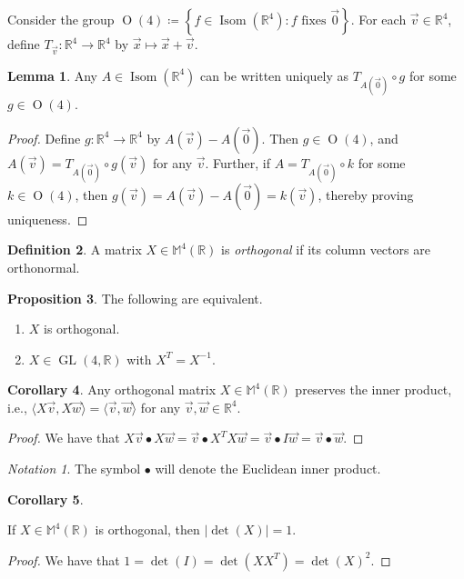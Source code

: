 \documentclass[10pt,letterpaper,cm]{nupset}
\theoremstyle{definition}
\newtheorem{definition}{Definition}[section]
\theoremstyle{theorem}
\newtheorem{lemma}[definition]{Lemma}
\newtheorem{cor}[definition]{Corollary}
\newtheorem{prop}[definition]{Proposition}
\theoremstyle{remark}
\newtheorem*{notation}{Notation}
\newcommand{\M}{\mathbb M}
\newcommand{\R}{\mathbb R}
\newcommand{\1}{\mathbf{1}}
\renewcommand{\v}{\vec v}
\newcommand{\w}{\vec w}
\newcommand{\x}{\vec x}
\newcommand{\0}{\vec {0}}
\DeclareMathOperator{\ORT}{O}
\DeclareMathOperator{\Isom}{Isom}
\DeclareMathOperator{\GL}{GL}
\begin{document}
Consider the group $\ORT(4)\coloneqq \left\{f\in  \Isom(\R^4): f \text{ fixes } \0\right\}$. For each $\v\in \R^4$, define $T_{\v}:\R^4\to \R^4$ by $\x \mapsto \x + \v$.

\begin{lemma}\label{l1}
Any $A\in \Isom(\R^4)$ can be  written uniquely as $T_{A(\0)}\circ g$ for some $g\in \ORT(4)$. 
\end{lemma}
\begin{proof}
Define $g:\R^4\to \R^4$ by $A(\v)-A(\0)$. Then $g\in \ORT(4)$, and $A(\v)=T_{A(\0)}\circ g(\v)$ for any $\v$. Further, if $A=T_{A(\0)}\circ k$ for some $k\in \ORT(4)$, then $g(\v)=A(\v)-A(\0)=k(\v)$, thereby proving uniqueness. 
\end{proof}

\begin{definition} 
A matrix  $X\in \M^4(\R)$ is \textit{orthogonal} if its column vectors are orthonormal.
\end{definition}

\begin{prop} The following are equivalent.
\begin{enumerate}[label=(\alph*)]  
\item $X$ is orthogonal. 
\item $X\in \GL(4, \R)$ with $X^T=X^{-1}$.
\end{enumerate}
\end{prop}


\begin{cor}\label{preip} Any orthogonal matrix $X\in \M^4(\R)$ preserves the inner product, i.e., $\langle X\v, X\w\rangle=\langle \v, \w\rangle$ for any $\v, \w\in \R^4$.
\end{cor}

\begin{proof}
We have that $X\v \bullet X\w=\v\bullet X^TX\w=\v \bullet I\w =\v \bullet \w$.
\end{proof}

\smallskip

\begin{notation}
The symbol $\bullet$ will denote the Euclidean inner product.
\end{notation}

\begin{cor}\label{c2}

If $X\in \M^4(\R)$ is orthogonal, then $\left\lvert{\det(X)}\right\rvert=1$.
\end{cor}

\begin{proof}
We have that $1=\det(I)=\det(XX^T)=\det(X)^2$.
\end{proof}
\end{document}
